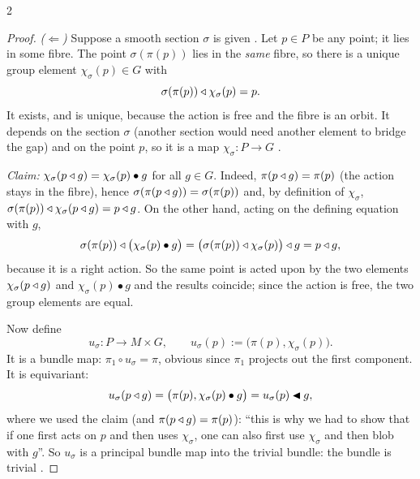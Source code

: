 \begin{paracol}{2}
\begin{proof}
\emph{($\Leftarrow$)} Suppose a smooth section $\sigma$ is given  . Let $p\in P$ be any point; it lies in some fibre. The point $\sigma(\pi(p))$ lies in the \emph{same} fibre, so there is a unique group element $\chi_\sigma(p)\in G$ with
\[
  \sigma(\pi(p))\mathbin{\triangleleft}\chi_\sigma(p)=p .
\]
It exists, and is unique, because the action is free and the fibre is an orbit. It depends on the section $\sigma$ (another section would need another element to bridge the gap) and on the point $p$, so it is a map $\chi_\sigma\colon P\to G$          .\par
\emph{Claim:} $\chi_\sigma(p\mathbin{\triangleleft} g)=\chi_\sigma(p)\bullet g$ for all $g\in G$. Indeed, $\pi(p\mathbin{\triangleleft} g)=\pi(p)$ (the action stays in the fibre), hence $\sigma(\pi(p\mathbin{\triangleleft} g))=\sigma(\pi(p))$ and, by definition of $\chi_\sigma$, $\sigma(\pi(p))\mathbin{\triangleleft}\chi_\sigma(p\mathbin{\triangleleft} g)=p\mathbin{\triangleleft} g$. On the other hand, acting on the defining equation with $g$,
\[
  \sigma(\pi(p))\mathbin{\triangleleft}\bigl(\chi_\sigma(p)\bullet g\bigr)=\bigl(\sigma(\pi(p))\mathbin{\triangleleft}\chi_\sigma(p)\bigr)\mathbin{\triangleleft} g=p\mathbin{\triangleleft} g ,
\]
because it is a right action. So the same point is acted upon by the two elements $\chi_\sigma(p\mathbin{\triangleleft} g)$ and $\chi_\sigma(p)\bullet g$ and the results coincide; since the action is free, the two group elements are equal.                \par
Now define
\[
  u_\sigma\colon P\to M\times G,\qquad u_\sigma(p):=\bigl(\pi(p),\chi_\sigma(p)\bigr).
\]
It is a bundle map: $\pi_1\circ u_\sigma=\pi$, obvious since $\pi_1$ projects out the first component. It is equivariant:
\[
  u_\sigma(p\mathbin{\triangleleft} g)=\bigl(\pi(p),\chi_\sigma(p)\bullet g\bigr)=u_\sigma(p)\mathbin{\blacktriangleleft} g ,
\]
where we used the claim (and $\pi(p\mathbin{\triangleleft} g)=\pi(p)$): ``this is why we had to show that if one first acts on $p$ and then uses $\chi_\sigma$, one can also first use $\chi_\sigma$ and then blob with $g$''. So $u_\sigma$ is a principal bundle map into the trivial bundle: the bundle is trivial                   .

\end{proof}
\end{paracol}
